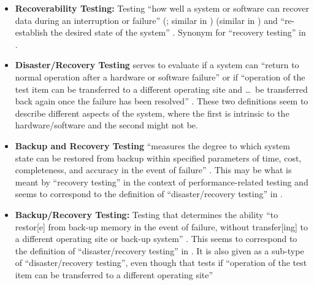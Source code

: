 \begin{itemize}
      \item \textbf{Recoverability Testing:} Testing ``how well a system or
            software can recover data during an interruption or failure''
            \ifnotpaper
                  (\citealp[p.~7-10]{SWEBOK2024}; similar in \citealp{ISO_IEC2023a})
            \else
                  \cite[p.~7-10]{SWEBOK2024} (similar in \cite{ISO_IEC2023a})
            \fi
            and ``re-establish the desired state of the system'' \citep{ISO_IEC2023a}.
            Synonym for ``recovery testing'' in \citet[p.~47]{Kam2008}.
      \item \textbf{Disaster/Recovery Testing} serves to evaluate if a system
            can ``return to normal operation after a hardware
            or software failure'' \citep[p.~140]{IEEE2017} or if ``operation of
            the test item can be transferred to a different operating site and
            \dots\ be transferred back again once the failure has been
            resolved'' \citeyearpar[p.~37]{IEEE2021}. These two definitions seem to
            describe different aspects of the system, where the first is
            intrinsic to the hardware/software and the second might not be.
      \item \textbf{Backup and Recovery Testing} ``measures the
            degree to which system state can be restored from backup within
            specified parameters of time, cost, completeness, and accuracy in
            the event of failure'' \citep[p.~2]{IEEE2013}. This may be what is
            meant by ``recovery testing'' in the context of performance-related
            testing and seems to correspond to the definition of
            ``disaster/recovery testing'' in \citeyearpar[p.~140]{IEEE2017}.
      \item \textbf{Backup/Recovery Testing:} Testing that determines the
            ability ``to restor[e] from back-up memory in the event of failure,
            without transfer[ing] to a different operating site or back-up
            system'' \citep[p.~37]{IEEE2021}. This seems to correspond to the
            definition of ``disaster/recovery testing'' in
            \citeyearpar[p.~37]{IEEE2021}. It is also given as a sub-type of
            ``disaster/recovery testing'', even though that tests if ``operation
            of the test item can be transferred to a different operating site''

\end{itemize}
